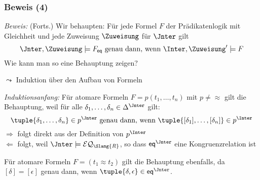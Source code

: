 \documentclass[aspectratio=1610,onlymath]{beamer}
\begin{document}
\begin{frame}[t]\frametitle{Beweis (4)}

% 

\emph{Beweis:} {\footnotesize(Forts.)}
Wir behaupten: Für jede Formel $F$ der Prädikatenlogik mit Gleichheit und jede Zuweisung $\Zuweisung$ für $\Jnter$ gilt
\[ \Jnter,\Zuweisung\models F_{\eqpred} \text{ genau dann, wenn } \Inter,\Zuweisung'\models F \]
Wie kann man so eine Behauptung zeigen?\bigskip\pause

$\leadsto$ \alert{Induktion über den Aufbau von Formeln}\bigskip

\emph{Induktionsanfang:} Für atomare Formeln $F=p(t_1,\ldots,t_n)$ mit $p\neq{\approx}$ gilt die Behauptung,
weil für alle $\delta_1,\ldots,\delta_n\in\Delta^\Jnter$ gilt:
\[ \tuple{\delta_1,\ldots,\delta_n}\in p^\Jnter \text{ genau dann, wenn } \tuple{[\delta_1],\ldots,[\delta_n]}\in p^\Inter \]
$\Rightarrow$ folgt direkt aus der Definition von $p^\Inter$\\
$\Leftarrow$ folgt, weil $\Jnter\models\mathcal{EQ}_{\Slang{R}}$, so dass $\eqpred^\Jnter$ eine Kongruenzrelation ist
\bigskip\pause

Für atomare Formeln $F=(t_1\approx t_2)$ gilt die Behauptung ebenfalls, da $[\delta]=[\epsilon]$ genau dann, wenn $\tuple{\delta,\epsilon}\in\eqpred^\Jnter$.
\end{frame}
\end{document}
